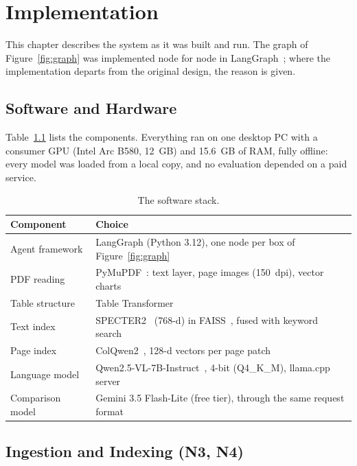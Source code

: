 \chapter{Implementation}
\label{sec:implementation}

This chapter describes the system as it was built and run. The graph of
Figure~\ref{fig:graph} was implemented node for node in LangGraph~\cite{langgraph};
where the implementation departs from the original design, the reason is given.

\section{Software and Hardware}

Table~\ref{tab:stack} lists the components. Everything ran on one desktop PC with a
consumer GPU (Intel Arc B580, 12~GB) and 15.6~GB of RAM, fully offline: every model
was loaded from a local copy, and no evaluation depended on a paid service.

\begin{table}[htbp]
\centering
\small
\begin{tabular}{lp{8.6cm}}
\toprule
Component & Choice \\
\midrule
Agent framework & LangGraph (Python 3.12), one node per box of Figure~\ref{fig:graph} \\
PDF reading & PyMuPDF~\cite{pymupdf}: text layer, page images (150~dpi), vector charts \\
Table structure & Table Transformer~\cite{smock2022pubtables} \\
Text index & SPECTER2~\cite{singh2023scirepeval} (768-d) in FAISS~\cite{johnson2019faiss}, fused with keyword search \\
Page index & ColQwen2~\cite{faysse2025colpali}, 128-d vectors per page patch \\
Language model & Qwen2.5-VL-7B-Instruct~\cite{bai2025qwen25vl}, 4-bit (Q4\_K\_M), llama.cpp~\cite{llamacpp} server \\
Comparison model & Gemini 3.5 Flash-Lite (free tier), through the same request format \\
\bottomrule
\end{tabular}
\caption{The software stack.}
\label{tab:stack}
\end{table}

\section{Ingestion and Indexing (N3, N4)}

